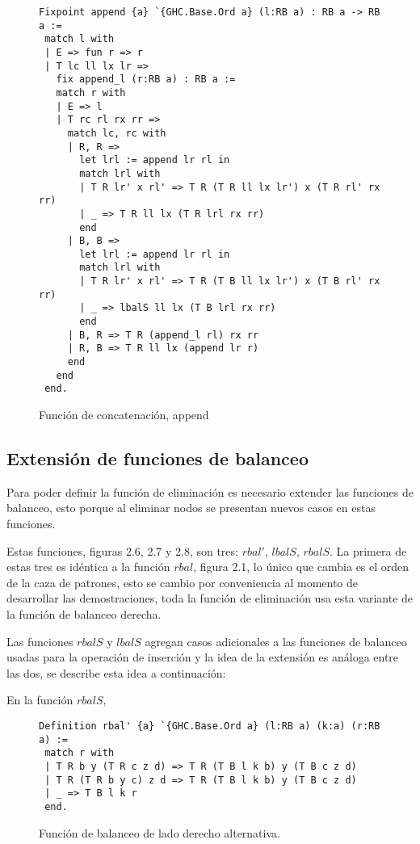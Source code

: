 \documentclass[letterpaper,12pt,oneside]{book}
\theoremstyle{plain}
\theoremstyle{definition}
\theoremstyle{remark}
\begin{document}
\begin{figure}
\centering 
\captionsetup{justification=centering}
\begin{verbatim}
Fixpoint append {a} `{GHC.Base.Ord a} (l:RB a) : RB a -> RB a :=
 match l with
 | E => fun r => r
 | T lc ll lx lr =>
   fix append_l (r:RB a) : RB a :=
   match r with
   | E => l
   | T rc rl rx rr =>
     match lc, rc with
     | R, R =>
       let lrl := append lr rl in
       match lrl with
       | T R lr' x rl' => T R (T R ll lx lr') x (T R rl' rx rr)
       | _ => T R ll lx (T R lrl rx rr)
       end
     | B, B =>
       let lrl := append lr rl in
       match lrl with
       | T R lr' x rl' => T R (T B ll lx lr') x (T B rl' rx rr)
       | _ => lbalS ll lx (T B lrl rx rr)
       end
     | B, R => T R (append_l rl) rx rr
     | R, B => T R ll lx (append lr r)
     end
   end
 end.
\end{verbatim}
\caption{Funci\'on de concatenaci\'on, append}
\end{figure}

\subsection{Extensi\'on de funciones de balanceo}

Para poder definir la funci\'on de eliminaci\'on es necesario extender las funciones de balanceo, esto 
porque al eliminar nodos se presentan nuevos casos en estas funciones.

Estas funciones, figuras 2.6, 2.7 y 2.8, son tres: $rbal'$, $lbalS$, $rbalS$. La primera de estas 
tres es idéntica a la función $rbal$, figura 2.1, lo \'unico que cambia es el orden de la caza de 
patrones, esto se cambio por conveniencia al momento de desarrollar las demostraciones, toda la 
funci\'on de eliminación usa esta variante de la funci\'on de balanceo derecha.


Las funciones $rbalS$ y $lbalS$ agregan casos adicionales a las funciones de balanceo usadas para la 
operaci\'on de inserci\'on y la idea de la extensión es análoga entre las dos, se describe esta idea a 
continuación:

En la funci\'on $rbalS$, 

\begin{figure}
\centering 
\captionsetup{justification=centering}
\begin{verbatim}
Definition rbal' {a} `{GHC.Base.Ord a} (l:RB a) (k:a) (r:RB a) :=
 match r with
 | T R b y (T R c z d) => T R (T B l k b) y (T B c z d)
 | T R (T R b y c) z d => T R (T B l k b) y (T B c z d)
 | _ => T B l k r
 end.

\end{verbatim}
\caption{Funci\'on de balanceo de lado derecho alternativa.}
\end{figure}
\end{document}
